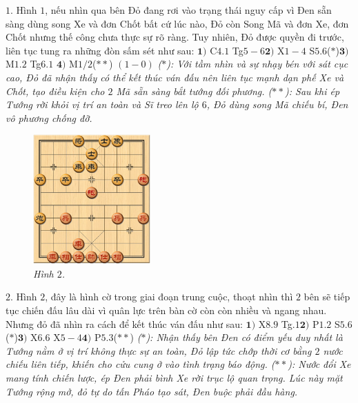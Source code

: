 \begin{multicols}{2}
\begin{figure}[H]
		\vspace*{-10pt}
	\end{figure}
	$1.$ Hình $1$, nếu nhìn qua bên Đỏ đang rơi vào trạng thái nguy cấp vì Đen sẵn sàng dùng song Xe và đơn Chốt bất cứ lúc nào, Đỏ còn Song Mã và đơn Xe, đơn Chốt nhưng thế công chưa thực sự rõ ràng. Tuy nhiên, Đỏ được quyền đi trước, liên tục tung ra những đòn sấm sét như sau:
	\vskip 0.1cm
	$\pmb{1)}$	C$4.1$ Tg$5-6$\quad  $\pmb{2)}$ X$1-4$ S$5.6$($*$)\quad $\pmb{3)}$ M$1.2$ Tg$6.1$ \quad$\pmb{4)}$ M$1/2$($**$) $(1- 0)$
	\vskip 0.1cm
	\textit{($*$): Với tầm nhìn và sự nhạy bén với sát cục cao, Đỏ đã nhận thấy có thể kết thúc ván đấu nên liên tục mạnh dạn phế Xe và Chốt, tạo điều kiện cho $2$ Mã sẵn sàng bắt tướng đối phương.
	\vskip 0.1cm
	($**$): Sau khi ép Tướng rời khỏi vị trí an toàn và Sĩ treo lên lộ $6$, Đỏ dùng song Mã chiếu bí, Đen vô phương chống đỡ.}
	\begin{figure}[H]
		\vspace*{-5pt}
		\centering
		\captionsetup{labelformat= empty, justification=centering}
		\includegraphics[width= 0.4\textwidth]{2}
		\caption{\small\textit{\color{gocco}Hình $2$.}}
		\vspace*{-10pt}
	\end{figure}
	$2.$ Hình $2$, đây là hình cờ trong giai đoạn trung cuộc, thoạt nhìn thì $2$ bên sẽ tiếp tục chiến đấu lâu dài vì quân lực trên bàn cờ còn còn nhiều và ngang nhau. Nhưng đỏ đã nhìn ra cách để kết thúc ván đấu như sau:  
	\vskip 0.1cm
	$\pmb{1)}$	X$8.9$ Tg$.1$\quad $\pmb{2)}$ P$1.2$ S$5.6$($*$)\quad $\pmb{3)}$ X$6.6$ X$5-4$\quad $\pmb{4)}$ P$5.3$($**$)
	\vskip 0.1cm
	\textit{($*$): Nhận thấy bên Đen có điểm yếu duy nhất là Tướng nằm ở vị trí không thực sự an toàn, Đỏ lập tức chớp thời cơ bằng $2$ nước chiếu liên tiếp, khiến cho cửu cung ở vào tình trạng báo động.
	\vskip 0.1cm
	($**$): Nước đổi Xe mang tính chiến lược, ép Đen phải bình Xe rời trục lộ quan trọng. Lúc này mặt Tướng rộng mở, đỏ tự do tấn Pháo tạo sát, Đen buộc phải đầu hàng.}

\end{multicols}
